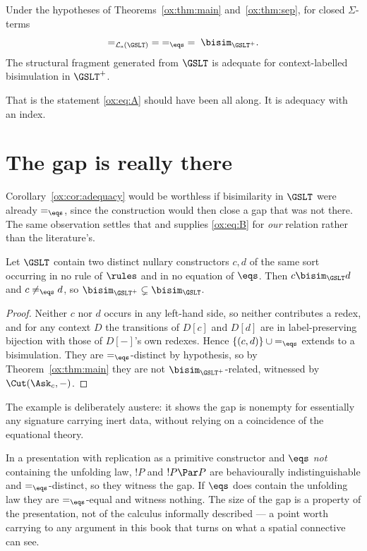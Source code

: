 \begin{corollary}
\label{ox:cor:adequacy}
Under the hypotheses of Theorems~\ref{ox:thm:main} and~\ref{ox:thm:sep}, for closed
$\Sigma$-terms
\[
  =_{\mathcal{L}_{\mathrm{s}}(\GSLT)} \;=\; =_{\eqs} \;=\; \bisim_{\GSLT^{+}} .
\]
The structural fragment generated from $\GSLT$ is adequate for context-labelled
bisimulation in $\GSLT^{+}$.
\end{corollary}

That is the statement \eqref{ox:eq:A} should have been all along. It is adequacy
with an index.

\section{The gap is really there}
\label{ox:sec:nonvac}

Corollary~\ref{ox:cor:adequacy} would be worthless if bisimilarity in $\GSLT$ were
already $=_{\eqs}$, since the construction would then close a gap that was not
there. The same observation settles that and supplies \eqref{ox:eq:B} for
\emph{our} relation rather than the literature's.

\begin{proposition}
\label{ox:prop:nonvac}
Let $\GSLT$ contain two distinct nullary constructors $c,d$ of the same sort
occurring in no rule of $\rules$ and in no equation of $\eqs$. Then
$c \bisim_{\GSLT} d$ and $c \neq_{\eqs} d$, so
$\bisim_{\GSLT^{+}} \subsetneq \bisim_{\GSLT}$.
\end{proposition}

\begin{proof}
Neither $c$ nor $d$ occurs in any left-hand side, so neither contributes a redex,
and for any context $D$ the transitions of $D[c]$ and $D[d]$ are in
label-preserving bijection with those of $D[-]$'s own redexes. Hence
$\{(c,d)\} \cup {=_{\eqs}}$ extends to a bisimulation. They are $=_{\eqs}$-distinct
by hypothesis, so by Theorem~\ref{ox:thm:main} they are not
$\bisim_{\GSLT^{+}}$-related, witnessed by $\Cut(\Ask_c,-)$.
\end{proof}

The example is deliberately austere: it shows the gap is nonempty for essentially
any signature carrying inert data, without relying on a coincidence of the
equational theory.

\begin{example}
\label{ox:ex:replication}
In a presentation with replication as a primitive constructor and $\eqs$
\emph{not} containing the unfolding law, $!P$ and $!P \Par P$ are behaviourally
indistinguishable and $=_{\eqs}$-distinct, so they witness the gap. If $\eqs$ does
contain the unfolding law they are $=_{\eqs}$-equal and witness nothing. The size
of the gap is a property of the presentation, not of the calculus informally
described --- a point worth carrying to any argument in this book that turns on
what a spatial connective can see.
\end{example}


